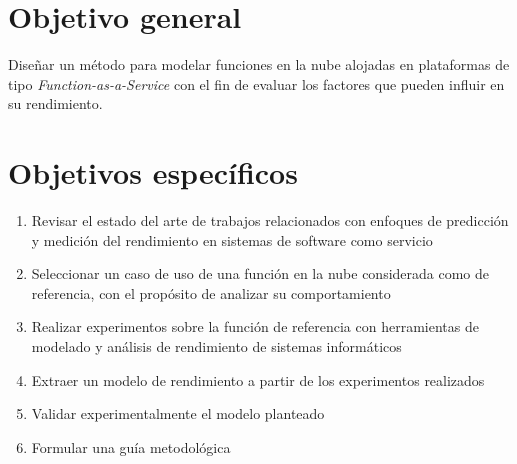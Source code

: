 \section{Objetivo general}
Diseñar un método para modelar funciones en la nube alojadas en plataformas de tipo \emph{Function-as-a-Service} con el fin de evaluar los factores que pueden influir en su rendimiento. 

\section{Objetivos específicos}
\begin{enumerate}
    \item Revisar el estado del arte de trabajos relacionados con enfoques de predicción y medición del rendimiento en sistemas de software como servicio
    \item Seleccionar un caso de uso de una función en la nube considerada como de referencia, con el propósito de analizar su comportamiento
    \item Realizar experimentos sobre la función de referencia con herramientas de modelado y análisis de rendimiento de sistemas informáticos     
    \item Extraer un modelo de rendimiento a partir de los experimentos realizados 
    \item Validar experimentalmente el modelo planteado
    \item Formular una guía metodológica
    
    
\end{enumerate}